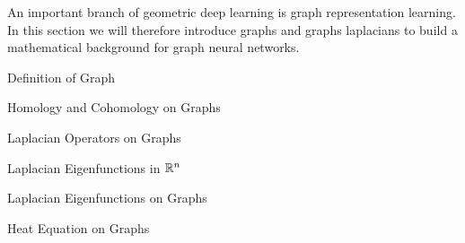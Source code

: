 \documentclass[../main.tex]{subfiles}
\begin{document}
    An important branch of geometric deep learning is graph representation learning. In this section we will therefore
    introduce graphs and graphs laplacians to build a mathematical background for graph neural networks. 
    \begin{section}{Definition of Graph}
           
    \end{section}
    \begin{section}{Homology and Cohomology on Graphs}
        
    \end{section}
    \begin{section}{Laplacian Operators on Graphs}
        
        \label{sec:2:3}
    \end{section}
    \begin{section}{Laplacian Eigenfunctions in $\mathbb{R}^n$}
        
    \end{section}
    \begin{section}{Laplacian Eigenfunctions on Graphs}
        
    \end{section}
    \begin{section}{Heat Equation on Graphs}
        
    \end{section}
\end{document}

